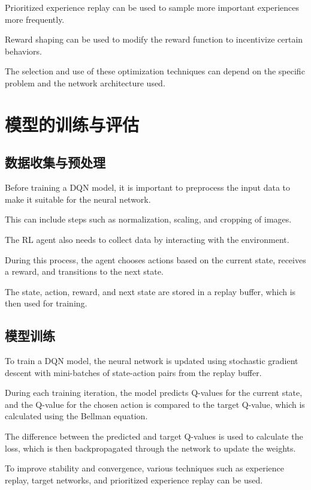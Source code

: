 Prioritized experience replay can be used to sample more important experiences more frequently.

Reward shaping can be used to modify the reward function to incentivize certain behaviors.

The selection and use of these optimization techniques can depend on the specific problem and the network architecture used.

\section{模型的训练与评估}

\subsection{数据收集与预处理}

Before training a DQN model, it is important to preprocess the input data to make it suitable for the neural network.

This can include steps such as normalization, scaling, and cropping of images.

The RL agent also needs to collect data by interacting with the environment.

During this process, the agent chooses actions based on the current state, receives a reward, and transitions to the next state.

The state, action, reward, and next state are stored in a replay buffer, which is then used for training.

\subsection{模型训练}

To train a DQN model, the neural network is updated using stochastic gradient descent with mini-batches of state-action pairs from the replay buffer.

During each training iteration, the model predicts Q-values for the current state, and the Q-value for the chosen action is compared to the target Q-value, which is calculated using the Bellman equation.

The difference between the predicted and target Q-values is used to calculate the loss, which is then backpropagated through the network to update the weights.

To improve stability and convergence, various techniques such as experience replay, target networks, and prioritized experience replay can be used.

